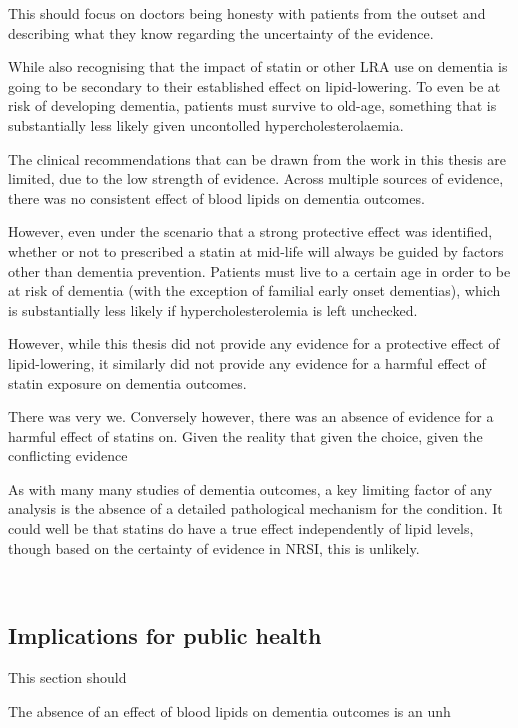 \documentclass[a4paper, twoside]{templates/ociamthesis}
\begin{document}
This should focus on doctors being honesty with patients from the outset and describing what they know regarding the uncertainty of the evidence.

While also recognising that the impact of statin or other LRA use on dementia is going to be secondary to their established effect on lipid-lowering. To even be at risk of developing dementia, patients must survive to old-age, something that is substantially less likely given uncontolled hypercholesterolaemia.

The clinical recommendations that can be drawn from the work in this thesis are limited, due to the low strength of evidence. Across multiple sources of evidence, there was no consistent effect of blood lipids on dementia outcomes.

However, even under the scenario that a strong protective effect was identified, whether or not to prescribed a statin at mid-life will always be guided by factors other than dementia prevention. Patients must live to a certain age in order to be at risk of dementia (with the exception of familial early onset dementias), which is substantially less likely if hypercholesterolemia is left unchecked.

However, while this thesis did not provide any evidence for a protective effect of lipid-lowering, it similarly did not provide any evidence for a harmful effect of statin exposure on dementia outcomes.

There was very we. Conversely however, there was an absence of evidence for a harmful effect of statins on. Given the reality that given the choice, given the conflicting evidence

As with many many studies of dementia outcomes, a key limiting factor of any analysis is the absence of a detailed pathological mechanism for the condition. It could well be that statins do have a true effect independently of lipid levels, though based on the certainty of evidence in NRSI, this is unlikely.

~

\newpage

\hypertarget{implications-for-public-health}{%
\subsection{Implications for public health}\label{implications-for-public-health}}

This section should

The absence of an effect of blood lipids on dementia outcomes is an unh
\end{document}
